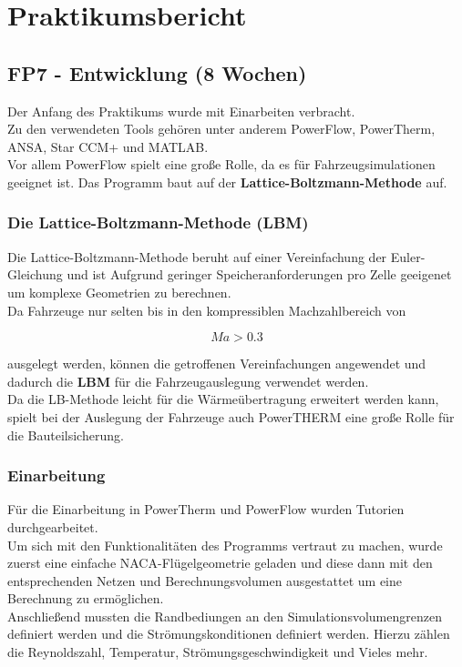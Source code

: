 \chapter{Praktikumsbericht}
\label{Bericht}

\section{FP7 - Entwicklung (8 Wochen)}
\label{FP7}

Der Anfang des Praktikums wurde mit Einarbeiten verbracht.\\
Zu den verwendeten Tools gehören unter anderem PowerFlow, PowerTherm, ANSA, Star CCM+ und MATLAB.\\


Vor allem PowerFlow spielt eine große Rolle, da es für Fahrzeugsimulationen geeignet ist. Das Programm baut auf der \textbf{Lattice-Boltzmann-Methode} auf.\\

\subsection{Die Lattice-Boltzmann-Methode (LBM)}
\label{LBM}
Die Lattice-Boltzmann-Methode beruht auf einer Vereinfachung der Euler-Gleichung und ist Aufgrund geringer Speicheranforderungen pro Zelle geeigenet um komplexe Geometrien zu berechnen. \\
Da Fahrzeuge nur selten bis in den kompressiblen Machzahlbereich von 

\begin{equation}
		\label{MachEq}
	Ma > 0.3
\end{equation}

ausgelegt werden, können die getroffenen Vereinfachungen angewendet und dadurch die \textbf{LBM} für die Fahrzeugauslegung verwendet werden. \\
Da die LB-Methode leicht für die Wärmeübertragung erweitert werden kann, spielt bei der Auslegung der Fahrzeuge auch PowerTHERM eine große Rolle für die Bauteilsicherung.

\subsection{Einarbeitung}
\label{Einarbeitung}

Für die Einarbeitung in PowerTherm und PowerFlow wurden Tutorien durchgearbeitet.\\
Um sich mit den Funktionalitäten des Programms vertraut zu machen, wurde zuerst eine einfache NACA-Flügelgeometrie geladen und diese dann mit den entsprechenden Netzen und Berechnungsvolumen ausgestattet um eine Berechnung zu ermöglichen. \\
Anschließend mussten die Randbediungen an den Simulationsvolumengrenzen definiert werden und die Strömungskonditionen definiert werden. Hierzu zählen die Reynoldszahl, Temperatur, Strömungsgeschwindigkeit und Vieles mehr.\\

